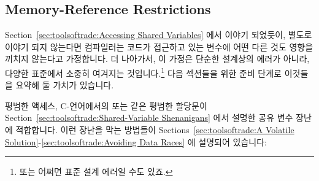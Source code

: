 \subsection{Memory-Reference Restrictions}
\label{sec:memorder:Memory-Reference Restrictions}

Section~\ref{sec:toolsoftrade:Accessing Shared Variables} 에서 이야기 되었듯이,
별도로 이야기 되지 않는다면 컴파일러는 코드가 접근하고 있는 변수에 어떤 다른
것도 영향을 끼치지 않는다고 가정합니다.
더 나아가서, 이 가정은 단순한 설계상의 에러가 아니라, 다양한 표준에서 소중히
여겨지는 것입니다.\footnote{
	또는 어쩌면 표준 설계 에러일 수도 있죠.}
다음 섹션들을 위한 준비 단계로 이것들을 요약해 둘 가치가 있습니다.

평범한 액세스, C-언어에서의  또는  같은 평범한 할당문이
Section~\ref{sec:toolsoftrade:Shared-Variable Shenanigans} 에서 설명한 공유
변수 장난에 적합합니다.
이런 장난을 막는 방법들이
Sections~\ref{sec:toolsoftrade:A Volatile Solution}-\ref{sec:toolsoftrade:Avoiding Data Races}
에 설명되어 있습니다:

